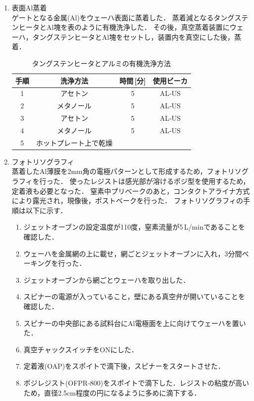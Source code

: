 \documentclass[11pt]{jarticle}
\begin{document}
\begin{enumerate}
			\item 表面Al蒸着\\
				ゲートとなる金属(Al)をウェーハ表面に蒸着した．
				蒸着減となるタングステンヒータとAl塊を表のように有機洗浄した．
				その後，真空蒸着装置にウェーハ，タングステンヒータとAl塊をセットし，装置内を真空にした後，蒸着．
				\begin{table}[H]
				\begin{center}
				\caption{タングステンヒータとアルミの有機洗浄方法}
				\label{tab:tangsten}
				\begin{tabular}{c|ccc} \toprule
					手順&洗浄方法&時間\,[分]&使用ビーカ\\ \hline
					1&アセトン&5&AL‐US\\
					2&メタノール&5&AL‐US\\
					3&アセトン&5&AL‐US\\
					4&メタノール&5&AL‐US\\
					5&ホットプレート上で乾燥&&\\ \bottomrule
				\end{tabular}
				\end{center}
				\end{table}
			\item フォトリソグラフィ\\
				蒸着したAl薄膜を2mm角の電極パターンとして形成するため，フォトリソグラフィを行った．
				使ったレジストは感光部が溶けるポジ型を使用するため，定着液も必要となった．
				窒素中プリべークのあと，コンタクトアライナ方式により露光され，現像後，ポストベークを行った．
				フォトリソグラフィの手順は以下に示す．
				\begin{enumerate}
					\item ジェットオーブンの設定温度が110度，窒素流量が5\,L/minであることを確認した．
					\item ウェーハを金属網の上に載せ，網ごとジェットオーブンに入れ，3分間ベーキングを行った．
					\item ジェットオーブンから網ごとウェーハを取り出した．
					\item スピナーの電源が入っていること，壁にある真空弁が開いていることを確認した．
					\item スピナーの中央部にある試料台にAl電極面を上に向けてウェーハを置いた．
					\item 真空チャックスイッチをONにした．
					\item 定着液(OAP)をスポイトで滴下後，スピナーをスタートさせた．
					\item ポジレジスト(OFPR‐800)をスポイトで滴下した．レジストの粘度が高いため，直径2.5cm程度の円になるように多めに滴下する．

\end{enumerate}
\end{enumerate}
\end{document}
